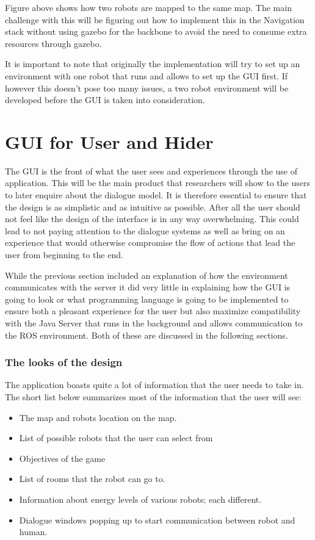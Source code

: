       Figure above shows how two robots are mapped to the same map. The main challenge with this will be figuring out how to implement this in the Navigation stack without using gazebo for the backbone to avoid the need to consume extra resources through gazebo.

      It is important to note that originally the implementation will try to set up an environment with one robot that runs and allows to set up the GUI first. If however this doesn't pose too many issues, a two robot environment will be developed before the GUI is taken into consideration.

    \section{GUI for User and Hider}
      The GUI is the front of what the user sees and experiences through the use of application. This will be the main product that researchers will show to the users to later enquire about the dialogue model. It is therefore essential to ensure that the design is as simplistic and as intuitive as possible. After all the user should not feel like the design of the interface is in any way overwhelming. This could lead to not paying attention to the dialogue systems as well as bring on an experience that would otherwise compromise the flow of actions that lead the user from beginning to the end.

      While the previous section included an explanation of how the environment communicates with the server it did very little in explaining how the GUI is going to look or what programming language is going to be implemented to ensure both a pleasant experience for the user but also maximize compatibility with the Java Server that runs in the background and allows communication to the ROS environment. Both of these are discussed in the following sections.

      \subsubsection{The looks of the design}
        The application boasts quite a lot of information that the user needs to take in. The short list below summarizes most of the information that the user will see:
        \begin{itemize}
          \item The map and robots location on the map.
          \item List of possible robots that the user can select from
          \item Objectives of the game
          \item List of rooms that the robot can go to.
          \item Information about energy levels of various robots; each different.
          \item Dialogue windows popping up to start communication between robot and human.
        \end{itemize}

